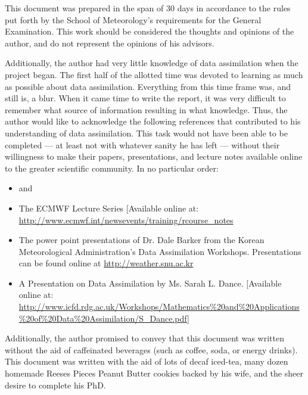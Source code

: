 

This document was prepared in the span of 30 days in accordance to the rules put forth by the School of Meteorology's requirements for the General Examination. This work should be considered the thoughts and opinions of the author, and do not represent the opinions of his advisors.


Additionally, the author had very little knowledge of data assimilation when the project began. The first half of the allotted time was devoted to learning as much as possible about data assimilation. Everything from this time frame was, and still is, a blur. When it came time to write the report, it was very difficult to remember what source of information resulting in what knowledge. Thus, the author would like to acknowledge the following references that contributed to his understanding of data assimilation. This task would not have been able to be completed --- at least not with whatever sanity he has left --- without their willingness to make their papers, presentations, and lecture notes available online to the greater scientific community. In no particular order:

\vspace{2em}
\begin{itemize}
    \item \cite{evensen1994enkf} and \cite{evensen2003enkf}
    \vspace{1em}
    \item The ECMWF Lecture Series [Available online at: \url{http://www.ecmwf.int/newsevents/training/rcourse_notes}
    \vspace{1em}
    \item The power point presentations of Dr. Dale Barker from the Korean Meteorological Administration's Data Assimilation Workshops. Presentations can be found online at \url{http://weather.snu.ac.kr}
    \vspace{1em}
    \item A Presentation on Data Assimilation by Ms. Sarah L. Dance. [Available online at: \url{http://www.icfd.rdg.ac.uk/Workshops/Mathematics%20and%20Applications%20of%20Data%20Assimilation/S_Dance.pdf}]
    \vspace{1em}
\end{itemize}


\noindent Additionally, the author promised to convey that this document was written without the aid of caffeinated beverages (such as coffee, soda, or energy drinks). This document was written with the aid of lots of decaf iced-tea, many dozen homemade Reeses Pieces Peanut Butter cookies backed by his wife, and the sheer desire to complete his PhD.